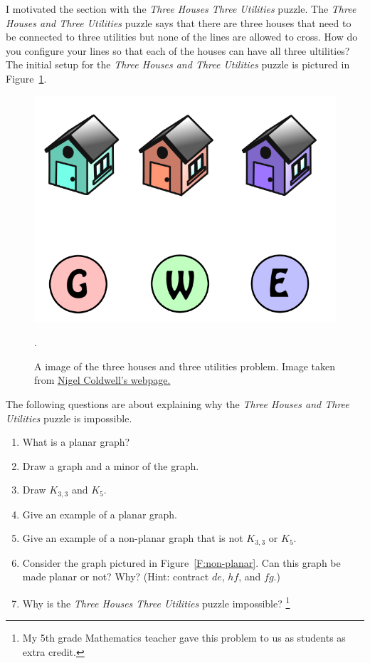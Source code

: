 \documentclass[11pt, letterpaper]{article}
\begin{document}
I motivated the section with the \emph{Three Houses Three Utilities} puzzle.
The \emph{Three Houses and Three Utilities} puzzle says that there are three houses that need to be connected to three utilities but none of the lines are allowed to cross. How do you configure your lines so that each of the houses can have all three ultilities? The initial setup for the \emph{Three Houses and Three Utilities} puzzle is pictured in Figure~\ref{F:three-houses}.
\begin{figure}[h]
	\begin{center}
		\includegraphics[scale=0.25]{three-houses.png}
	\end{center}
	\caption{A image of the three houses and three utilities problem.  Image taken from \href{http://puzzles.nigelcoldwell.co.uk/twentysix.htm}{Nigel Coldwell's webpage.} }\label{F:three-houses}.
\end{figure}
The following questions are about explaining why the \emph{Three Houses and Three Utilities} puzzle is impossible. 

\begin{enumerate}
	\item What is a planar graph?
	\item Draw a graph and a minor of the graph. 
	\item Draw $K_{3,3}$ and $K_5$.
	\item Give an example of a planar graph.
	\item Give an example of a non-planar graph that is not $K_{3,3}$ or $K_5$.
	\item Consider the graph pictured in Figure~\ref{F:non-planar}. Can this graph be made planar or not? Why? (Hint: contract $de$, $hf$, and $fg$.)
	\item Why is the \emph{Three Houses Three Utilities} puzzle impossible? \footnote{My 5th grade Mathematics teacher gave this problem to us as students as extra credit.}
\end{enumerate}
\end{document}
